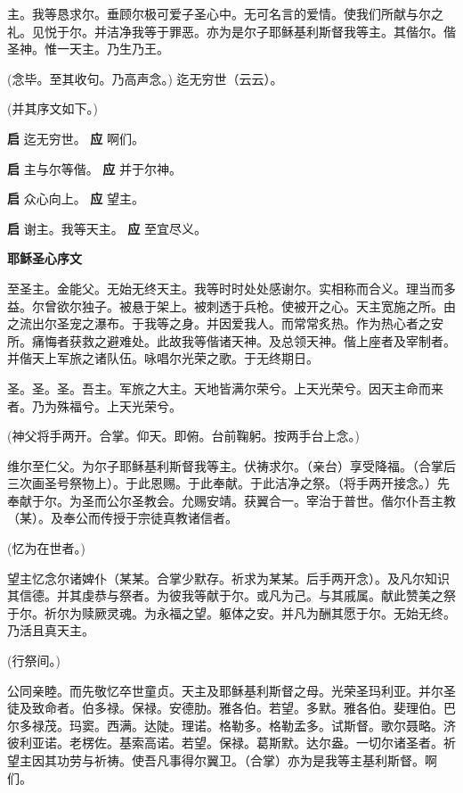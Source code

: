 \documentclass[UTF8,17pt]{ctexart}
\newcommand{\blood}[1]{\textcolor{Mahogany}{#1}}
\begin{document}
主。我等恳求尔。垂顾尔极可爱⼦圣⼼中。⽆可名⾔的爱情。使我们所献与尔之礼。见悦于尔。并洁净我等于罪恶。亦为是尔⼦耶稣基利斯督我等主。其偕尔。偕圣神。惟⼀天主。乃⽣乃王。

(念毕。⾄其收句。乃⾼声念。) 迄⽆穷世（云云）。

(并其序⽂如下。)

\textbf{启} \quad 迄⽆穷世。  \hfill \textbf{应} \quad 啊们。\phantom{C}\phantom{C}
    
\textbf{启} \quad 主与尔等偕。 \hfill  \textbf{应} \quad 并于尔神。
    
\textbf{启} \quad 众⼼向上。  \hfill \textbf{应} \quad 望主。\phantom{C}\phantom{C}
    
\textbf{启} \quad 谢主。我等天主。 \hfill  \textbf{应} \quad ⾄宜尽义。

\textbf{耶稣圣⼼序⽂}

⾄圣主。⾦能⽗。⽆始⽆终天主。我等时时处处感谢尔。实相称⽽合义。理当⽽多益。尔曾欲尔独⼦。被悬于架上。被刺透于兵枪。使被开之⼼。天主宽施之所。由之流出尔圣宠之瀑布。于我等之⾝。并因爱我⼈。⽽常常炙热。作为热⼼者之安所。痛悔者获救之避难处。此故我等偕诸天神。及总领天神。偕上座者及宰制者。并偕天上军旅之诸队伍。咏唱尔光荣之歌。于⽆终期⽇。

圣。圣。圣。吾主。军旅之⼤主。天地皆满尔荣兮。上天光荣兮。因天主命⽽来者。乃为殊福兮。上天光荣兮。

(神⽗将⼿两开。合掌。仰天。即俯。台前鞠躬。按两⼿台上念。)

维尔⾄仁⽗。为尔⼦耶稣基利斯督我等主。伏祷求尔。（亲台）享受降福。（合掌后三次画圣号祭物上）。于此\blood{\maltese}恩赐。于此\blood{\maltese}奉献。于此\blood{\maltese}洁净之祭。（将⼿两开接念。）先奉献于尔。为圣⽽公尔圣教会。允赐安靖。获翼合⼀。宰治于普世。偕尔仆吾主教（某）。及奉公⽽传授于宗徒真教诸信者。

(忆为在世者。)

望主忆念尔诸婢仆（某某。合掌少默存。祈求为某某。后⼿两开念）。及凡尔知识其信德。并其虔恭与祭者。为彼我等献于尔。或凡为⼰。与其戚属。献此赞美之祭于尔。祈尔为赎厥灵魂。为永福之望。躯体之安。并凡为酬其愿于尔。⽆始⽆终。乃活且真天主。

(⾏祭间。)

公同亲睦。⽽先敬忆卒世童贞。天主及耶稣基利斯督之母。光荣圣玛利亚。并尔圣徒及致命者。伯多禄。保禄。安德肋。雅各伯。若望。多默。雅各伯。斐理伯。巴尔多禄茂。玛窦。西满。达陡。理诺。格勒多。格勒孟多。试斯督。歌尔聂略。济彼利亚诺。⽼楞佐。基索⾼诺。若望。保禄。葛斯默。达尔盎。⼀切尔诸圣者。祈望主因其功劳与祈祷。使吾凡事得尔翼卫。（合掌）亦为是我等主基利斯督。啊们。
\end{document}
